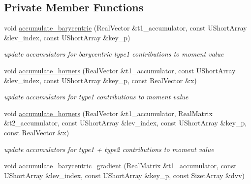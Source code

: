 \subsection*{Private Member Functions}
\begin{DoxyCompactItemize}
\item 
void \hyperlink{classPecos_1_1SharedNodalInterpPolyApproxData_a9275b6f1c90edf907c3cd35eff0c4758}{accumulate\+\_\+barycentric} (Real\+Vector \&t1\+\_\+accumulator, const U\+Short\+Array \&lev\+\_\+index, const U\+Short\+Array \&key\+\_\+p)\label{classPecos_1_1SharedNodalInterpPolyApproxData_a9275b6f1c90edf907c3cd35eff0c4758}

\begin{DoxyCompactList}\small\item\em update accumulators for barycentric type1 contributions to moment value \end{DoxyCompactList}\item 
void \hyperlink{classPecos_1_1SharedNodalInterpPolyApproxData_acdaea4ac4c897f9ca14326b8a7bcced7}{accumulate\+\_\+horners} (Real\+Vector \&t1\+\_\+accumulator, const U\+Short\+Array \&lev\+\_\+index, const U\+Short\+Array \&key\+\_\+p, const Real\+Vector \&x)\label{classPecos_1_1SharedNodalInterpPolyApproxData_acdaea4ac4c897f9ca14326b8a7bcced7}

\begin{DoxyCompactList}\small\item\em update accumulators for type1 contributions to moment value \end{DoxyCompactList}\item 
void \hyperlink{classPecos_1_1SharedNodalInterpPolyApproxData_a4bebbc97c0cf05a4ecddcbbbc83f229c}{accumulate\+\_\+horners} (Real\+Vector \&t1\+\_\+accumulator, Real\+Matrix \&t2\+\_\+accumulator, const U\+Short\+Array \&lev\+\_\+index, const U\+Short\+Array \&key\+\_\+p, const Real\+Vector \&x)\label{classPecos_1_1SharedNodalInterpPolyApproxData_a4bebbc97c0cf05a4ecddcbbbc83f229c}

\begin{DoxyCompactList}\small\item\em update accumulators for type1 + type2 contributions to moment value \end{DoxyCompactList}\item 
void \hyperlink{classPecos_1_1SharedNodalInterpPolyApproxData_af8bf899f75945544343081be0174cd6d}{accumulate\+\_\+barycentric\+\_\+gradient} (Real\+Matrix \&t1\+\_\+accumulator, const U\+Short\+Array \&lev\+\_\+index, const U\+Short\+Array \&key\+\_\+p, const Sizet\+Array \&dvv)\label{classPecos_1_1SharedNodalInterpPolyApproxData_af8bf899f75945544343081be0174cd6d}


\end{DoxyCompactItemize}
